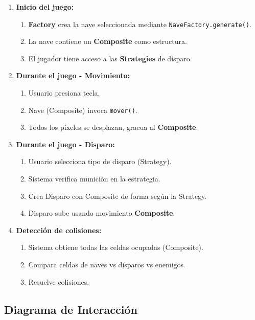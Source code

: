 \documentclass[12pt]{article}
\begin{document}
\begin{enumerate}
    \item \textbf{Inicio del juego:}
    \begin{enumerate}
        \item \textbf{Factory} crea la nave seleccionada mediante \texttt{NaveFactory.generate()}.
        \item La nave contiene un \textbf{Composite} como estructura.
        \item El jugador tiene acceso a las \textbf{Strategies} de disparo.
    \end{enumerate}
    
    \item \textbf{Durante el juego - Movimiento:}
    \begin{enumerate}
        \item Usuario presiona tecla.
        \item Nave (Composite) invoca \texttt{mover()}.
        \item Todos los píxeles se desplazan, gracua al \textbf{Composite}.
    \end{enumerate}
    
    \item \textbf{Durante el juego - Disparo:}
    \begin{enumerate}
        \item Usuario selecciona tipo de disparo (Strategy).
        \item Sistema verifica munición en la estrategia.
        \item Crea Disparo con Composite de forma según la Strategy.
        \item Disparo sube usando movimiento \textbf{Composite}.
    \end{enumerate}
    
    \item \textbf{Detección de colisiones:}
    \begin{enumerate}
        \item Sistema obtiene todas las celdas ocupadas (Composite).
        \item Compara celdas de naves vs disparos vs enemigos.
        \item Resuelve colisiones.
    \end{enumerate}
\end{enumerate}

\subsection{Diagrama de Interacción}
\end{document}
